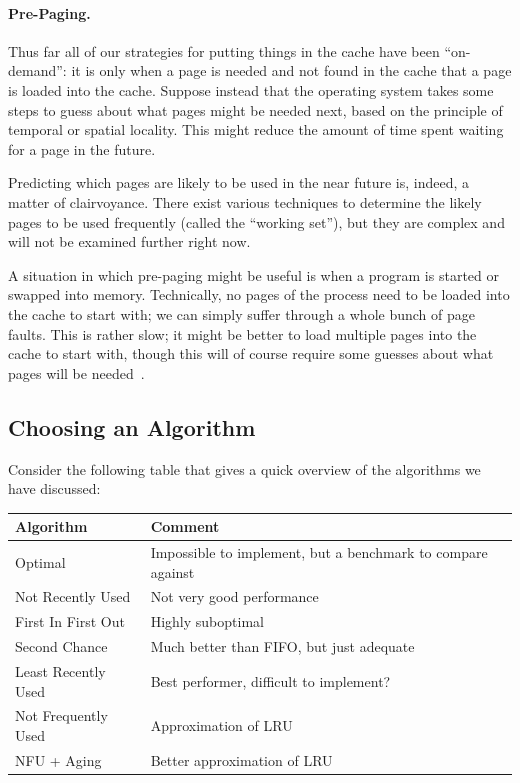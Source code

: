 \paragraph{Pre-Paging.}
Thus far all of our strategies for putting things in the cache have been ``on-demand'': it is only when a page is needed and not found in the cache that a page is loaded into the cache. Suppose instead that the operating system takes some steps to guess about what pages might be needed next, based on the principle of temporal or spatial locality. This might reduce the amount of time spent waiting for a page in the future.

Predicting which pages are likely to be used in the near future is, indeed, a matter of clairvoyance. There exist various techniques to determine the likely pages to be used frequently (called the ``working set''), but they are complex and will not be examined further right now.

A situation in which pre-paging might be useful is when a program is started or swapped into memory. Technically, no pages of the process need to be loaded into the cache to start with; we can simply suffer through a whole bunch of page faults. This is rather slow; it might be better to load multiple pages into the cache to start with, though this will of course require some guesses about what pages will be needed~\cite{mos}.

\subsection*{Choosing an Algorithm}
Consider the following table that gives a quick overview of the algorithms we have discussed:

\begin{center}
\begin{tabular}{l|l}
	\textbf{Algorithm} & \textbf{Comment} \\ \hline
	Optimal & Impossible to implement, but a benchmark to compare against\\
	Not Recently Used &  Not very good performance \\
	First In First Out & Highly suboptimal \\
	Second Chance & Much better than FIFO, but just adequate \\
	Least Recently Used & Best performer, difficult to implement? \\
	Not Frequently Used & Approximation of LRU \\
	NFU + Aging & Better approximation of LRU\\
\end{tabular}
\end{center}

